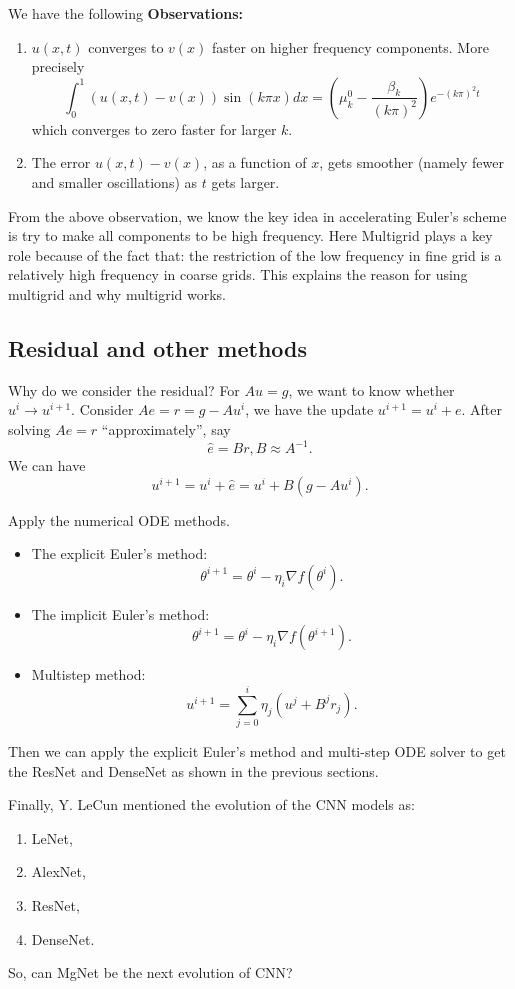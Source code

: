 We have the following {\bf Observations:}

\begin{enumerate}
	\item $u(x,t)$ converges to $v(x)$ faster on higher frequency
	components.  More precisely
	$$ \int_0^1 (u(x,t)-v(x))\sin(k\pi
	x)dx=\left(\mu^0_k-\frac{\beta_k}{(k\pi)^2}\right)e^{-(k\pi)^2t}
	$$
	which converges to zero faster for larger $k$.
	
	\item The error $u(x,t)-v(x)$, as a function of $x$, gets smoother
	(namely fewer and smaller oscillations) as $t$ gets larger. 
\end{enumerate}
From the above observation, we know the key idea in accelerating
Euler's scheme is try to make all components to be high frequency.
Here Multigrid plays a key role because of the fact that:
{	the restriction of the low frequency in fine grid is a relatively high 
	frequency in coarse grids. }
This explains the reason for using multigrid and why multigrid works. 

\subsection{Residual and other methods}
Why do we consider the residual?
For $Au=g$, we want to know whether $u^i \to u^{i+1}$.
Consider $Ae=r=g-Au^i$, we have the update $u^{i+1}=u^i+e$.
After solving $Ae=r$ ``approximately'', say 
\begin{equation} 
\hat{e}=Br, B\approx A^{-1}. 
\end{equation} 
We can have 
\begin{equation} u^{i+1}=u^i+\hat{e}=u^i+B(g-Au^i). \end{equation}

Apply the numerical ODE methods.
\begin{itemize}
	\item The explicit Euler's method:
\begin{equation} \theta^{i+1}=\theta^i-\eta_i\nabla f(\theta^i). \end{equation}
\item The implicit Euler's method:
\begin{equation} \theta^{i+1}=\theta^i-\eta_i\nabla f(\theta^{i+1}). \end{equation}
\item  Multistep method:
\begin{equation} u^{i+1}= \sum_{j=0}^{i} \eta_j(u^j+B^j r_j ). 
\end{equation}
\end{itemize}
Then we can apply the explicit Euler's method and multi-step ODE solver
to get the ResNet and DenseNet as shown in the previous sections.

Finally, Y. LeCun mentioned the evolution of the CNN models as:
\begin{enumerate}
	\item LeNet,
	\item AlexNet,
	\item ResNet,
	\item DenseNet.
\end{enumerate}
So, can MgNet be the next evolution of CNN?


